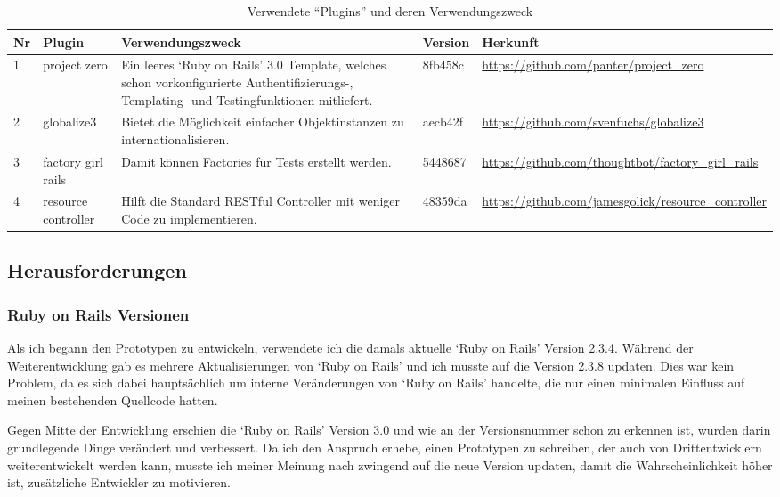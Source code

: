 \begin{table}[ht]
\begin{center}
    \begin{tabular}{llp{6cm}lp{3cm}}
        \toprule Nr & Plugin & Verwendungszweck & Version & Herkunft \\
        \midrule 1 & project zero & Ein leeres `Ruby on Rails' 3.0 Template, welches
                 schon vorkonfigurierte Authentifizierungs-, Templating- und Testingfunktionen
                 mitliefert. & 8fb458c & \url{https://github.com/panter/project_zero} \\
        \midrule 2 & globalize3 & Bietet die Möglichkeit einfacher Objektinstanzen
                 zu internationalisieren. & aecb42f & \url{https://github.com/svenfuchs/globalize3} \\
        \midrule 3 & factory girl rails & Damit können Factories \cite{factory} für Tests
                 erstellt werden. & 5448687 & \url{https://github.com/thoughtbot/factory_girl_rails} \\
        \midrule 4 & resource controller & Hilft die Standard RESTful \cite{restful} Controller mit weniger Code
                 zu implementieren. & 48359da & \url{https://github.com/jamesgolick/resource_controller} \\
        \bottomrule
    \end{tabular}
    \caption{Verwendete ``Plugins'' und deren Verwendungszweck}
    \label{tab:plugins}
\end{center}
\end{table}

\clearpage

\subsection{Herausforderungen}
\subsubsection{Ruby on Rails Versionen}
Als ich begann den Prototypen zu entwickeln, verwendete ich die damals aktuelle
`Ruby on Rails' Version 2.3.4. Während der Weiterentwicklung gab es mehrere
Aktualisierungen von `Ruby on Rails' und ich musste auf die Version 2.3.8
updaten. Dies war kein Problem, da es sich dabei hauptsächlich um interne
Veränderungen von `Ruby on Rails' handelte, die nur einen minimalen Einfluss 
auf meinen bestehenden Quellcode hatten.

Gegen Mitte der Entwicklung erschien die `Ruby on Rails' Version 3.0 und wie
an der Versionsnummer schon zu erkennen ist, wurden darin grundlegende Dinge
verändert und verbessert. Da ich den Anspruch erhebe, einen Prototypen zu schreiben,
der auch von Drittentwicklern weiterentwickelt werden kann, musste ich meiner
Meinung nach zwingend auf die neue Version updaten, damit die Wahrscheinlichkeit
höher ist, zusätzliche Entwickler zu motivieren.

